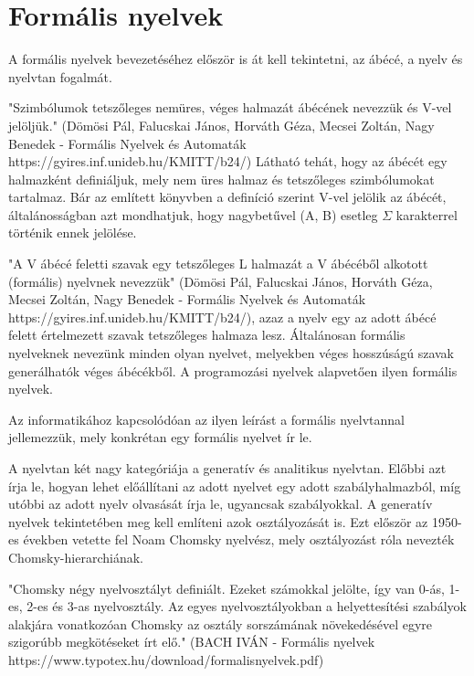 
\section{Formális nyelvek}


A formális nyelvek bevezetéséhez először is át kell tekintetni, az ábécé, a nyelv és nyelvtan fogalmát.

"Szimbólumok tetszőleges nemüres, véges halmazát ábécének nevezzük és V-vel jelöljük." (Dömösi Pál, Falucskai János, Horváth Géza, Mecsei Zoltán, Nagy Benedek - Formális Nyelvek és Automaták https://gyires.inf.unideb.hu/KMITT/b24/) Látható tehát, hogy az ábécét egy halmazként definiáljuk, mely nem üres halmaz és tetszőleges szimbólumokat tartalmaz. Bár az említett könyvben a definíció szerint V-vel jelölik az ábécét, általánosságban azt mondhatjuk, hogy nagybetűvel (A, B) esetleg $\Sigma$ karakterrel történik ennek jelölése.

"A V ábécé feletti szavak egy tetszőleges L halmazát a V ábécéből alkotott (formális) nyelvnek nevezzük" (Dömösi Pál, Falucskai János, Horváth Géza, Mecsei Zoltán, Nagy Benedek - Formális Nyelvek és Automaták https://gyires.inf.unideb.hu/KMITT/b24/), azaz a nyelv egy az adott ábécé felett értelmezett szavak tetszőleges halmaza lesz. Általánosan formális nyelveknek nevezünk minden olyan nyelvet, melyekben véges hosszúságú szavak generálhatók véges ábécékből. A programozási nyelvek alapvetően ilyen formális nyelvek.

Az informatikához kapcsolódóan az ilyen leírást a formális nyelvtannal jellemezzük, mely konkrétan egy formális nyelvet ír le.

A nyelvtan két nagy kategóriája a generatív és analitikus nyelvtan. Előbbi azt írja le, hogyan lehet előállítani az adott nyelvet egy adott szabályhalmazból, míg utóbbi az adott nyelv olvasását írja le, ugyancsak szabályokkal.
A generatív nyelvek tekintetében meg kell említeni azok osztályozását is. Ezt először az 1950-es években vetette fel Noam Chomsky nyelvész, mely osztályozást róla nevezték Chomsky-hierarchiának.

"Chomsky négy nyelvosztályt definiált. Ezeket számokkal jelölte, így van 0-ás, 1-es, 2-es és 3-as nyelvosztály. Az egyes nyelvosztályokban a helyettesítési szabályok alakjára vonatkozóan Chomsky az osztály sorszámának növekedésével egyre szigorúbb megkötéseket írt elő." (BACH IVÁN - Formális nyelvek https://www.typotex.hu/download/formalisnyelvek.pdf)

